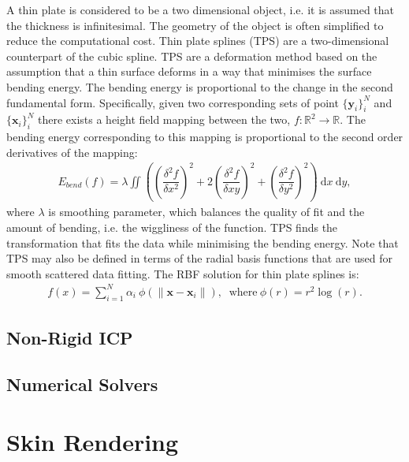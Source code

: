 \documentclass[11pt]{report}
\newcommand{\x}{\mathbf{x}}
\newcommand{\y}{\mathbf{y}}
\newcommand{\dd}{\: \mathrm{d}}
\begin{document}
A thin plate is considered to be a two dimensional object, i.e. it is assumed that the thickness is infinitesimal. The geometry of the object is often simplified to reduce the computational cost. Thin plate splines (TPS) are a two-dimensional counterpart of the cubic spline. TPS are a deformation method based on the assumption that a thin surface deforms in a way that minimises the surface bending energy. The bending energy is proportional to the change in the second fundamental form. Specifically, given two corresponding sets of point $\{\y_i\}_i^N$ and $\{\x_i\}_i^N$ there exists a height field mapping between the two, $f: \mathbb{R}^2 \to \mathbb{R}$. The bending energy corresponding to this mapping is proportional to the second order derivatives of the mapping:
\begin{equation}
\begin{aligned}
	E_{bend}(f) = \lambda \iint \left( \left( \dfrac{\delta^2f}{\delta x^2} \right)^2 +  2 \left( \dfrac{\delta^2f}{\delta x y} \right)^2 +  \left( \dfrac{\delta^2f}{\delta y^2} \right)^2 \right) \dd x \dd y,
\end{aligned}
\end{equation} where $\lambda$ is smoothing parameter, which balances the quality of fit and the amount of bending, i.e. the wiggliness of the function. TPS finds the transformation that fits the data while minimising the bending energy. Note that TPS may also be defined in terms of the radial basis functions that are used for smooth scattered data fitting. The RBF solution for thin plate splines is:
\begin{equation}
\begin{aligned}
	f(x) = \sum_{i=1}^N \alpha_i \: \phi(\|\x - \x_i\|), \: \text{ where} \: \phi(r) = r^2 \log(r).
\end{aligned}
\end{equation} 

\subsection{Non-Rigid ICP}


\subsection{Numerical Solvers}



\section{Skin Rendering}
\end{document}
